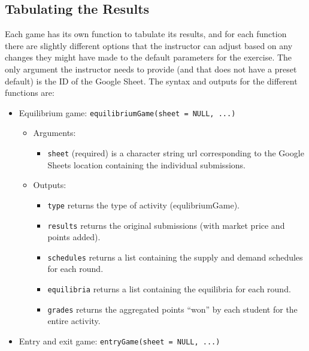 \documentclass[
]{article}
\providecommand{\tightlist}{%
  \setlength{\itemsep}{0pt}\setlength{\parskip}{0pt}}
\begin{document}
\hypertarget{tabulating-the-results}{%
\subsection{Tabulating the Results}\label{tabulating-the-results}}

Each game has its own function to tabulate its results, and for each
function there are slightly different options that the instructor can
adjust based on any changes they might have made to the default
parameters for the exercise. The only argument the instructor needs to
provide (and that does not have a preset default) is the ID of the
Google Sheet. The syntax and outputs for the different functions are:

\begin{itemize}
\item
  Equilibrium game: \texttt{equilibriumGame(sheet\ =\ NULL,\ ...)}

  \begin{itemize}
  \item
    Arguments:

    \begin{itemize}
    \tightlist
    \item
      \texttt{sheet} (required) is a character string url corresponding
      to the Google Sheets location containing the individual
      submissions.
    \end{itemize}
  \item
    Outputs:

    \begin{itemize}
    \tightlist
    \item
      \texttt{type} returns the type of activity (equlibriumGame).
    \item
      \texttt{results} returns the original submissions (with market
      price and points added).
    \item
      \texttt{schedules} returns a list containing the supply and demand
      schedules for each round.
    \item
      \texttt{equilibria} returns a list containing the equilibria for
      each round.
    \item
      \texttt{grades} returns the aggregated points ``won'' by each
      student for the entire activity.
    \end{itemize}
  \end{itemize}
\item
  Entry and exit game: \texttt{entryGame(sheet\ =\ NULL,\ ...)}


\end{itemize}
\end{document}
